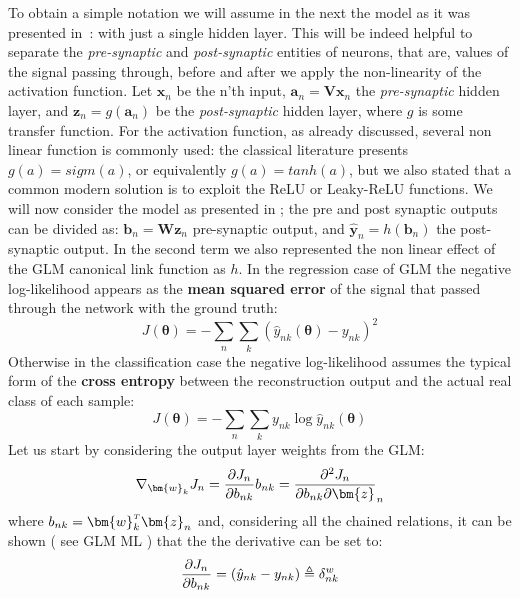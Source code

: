 To obtain a simple notation we will assume in the next the model as it was presented in~\Figure{\ref{fig:generic_mlp_a}}: with just a single hidden layer. This will be indeed helpful to separate the \textit{pre-synaptic} and \textit{post-synaptic} entities of neurons, that are, values of the signal passing through, before and after we apply the non-linearity of the activation function. Let $\bm{x}_n$ be the n'th input, $\bm{a}_n = \bm{V}\bm{x}_n$ the \textit{pre-synaptic} hidden layer, and $\bm{z}_n = g(\bm{a}_n)$ be the \textit{post-synaptic} hidden layer, where $g$ is some transfer function. 
For the activation function, as already discussed, several non linear function is commonly used: the classical literature presents $g(a) = sigm(a)$, or equivalently $g(a) = tanh(a)$, but we also stated that a common modern solution is to exploit the ReLU or Leaky-ReLU functions. 
We will now consider the model as presented in \Equation{\ref{eq:mlp_a}}; the pre and post synaptic outputs can be divided as: $\bm{b}_n = \bm{W}\bm{z}_n$ pre-synaptic output, and $\hat{\bm{y}}_n = h(\bm{b}_n)$ the post-synaptic output. In the second term we also represented the non linear effect of the \acl{GLM} canonical link function as $h$.
In the regression case of \acl{GLM} the negative log-likelihood appears as the \textbf{mean squared error} of the signal that passed through the network with the ground truth:
\begin{equation}
    J(\bm{\theta}) = -\sum_n\sum_k \left(\hat{y}_{nk}(\bm{\theta}) - y_{nk}\right)^2
\end{equation}
Otherwise in the classification case the negative log-likelihood assumes the typical form of the \textbf{cross entropy} between the reconstruction output and the actual real class of each sample:
\begin{equation}
    J(\bm{\theta}) = -\sum_n\sum_k y_{nk} \log \hat{y}_{nk}(\bm{\theta})
\end{equation}
%
Let us start by considering the output layer weights from the \acl{GLM}:
\begin{equation}
    \nabla_{\bm{w}_k} J_n = \pdv{J_n}{b_{nk}} b_{nk} = \pdv{J_n}{b_{nk}} \bm{z}_n
\end{equation}
where $b_{nk} = \transpose{\bm{w}_k}\bm{z}_n$ and, considering all the chained relations, it can be shown ( see GLM ML ) that the the derivative can be set to:
\begin{equation}
    \pdv{J_n}{b_{nk}} = ( \hat{y}_{nk} - y_{nk} ) \triangleq \delta_{nk}^w
\end{equation}
